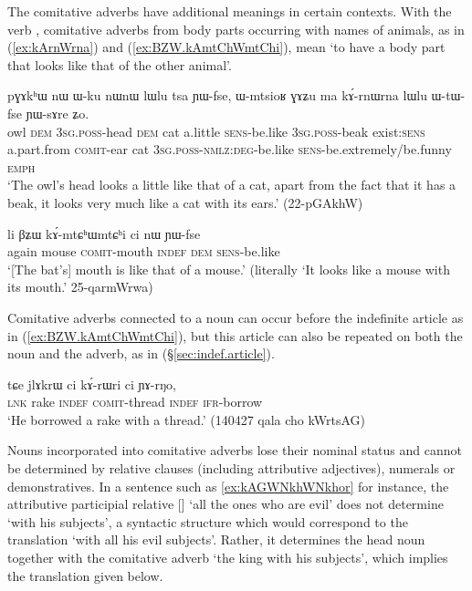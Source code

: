 The comitative adverbs have additional meanings in certain contexts. With the verb , comitative adverbs from body parts occurring with names of animals, as in (\ref{ex:kArnWrna}) and (\ref{ex:BZW.kAmtChWmtChi}), mean `to have a body part that looks like that of the other animal'.
\largerpage
\begin{exe}
	\ex \label{ex:kArnWrna}
	\gll pɣɤkʰɯ nɯ ɯ-ku nɯnɯ lɯlu tsa ɲɯ-fse, ɯ-mtsioʁ ɣɤʑu ma kɤ́-rnɯ\redp{}rna lɯlu ɯ-tɯ-fse ɲɯ-sɤre ʑo. \\
	owl \textsc{dem} \textsc{3sg}.\textsc{poss}-head \textsc{dem} cat a.little \textsc{sens}-be.like \textsc{3sg}.\textsc{poss}-beak exist:\textsc{sens} a.part.from \textsc{comit}-ear cat \textsc{3sg}.\textsc{poss}-\textsc{nmlz}:\textsc{deg}-be.like \textsc{sens}-be.extremely/be.funny \textsc{emph} \\
	\glt `The owl's head looks a little like that of a cat, apart from the fact that it has a beak, it looks very much like a cat with its ears.' (22-pGAkhW)
\end{exe}

\begin{exe}
\ex \label{ex:BZW.kAmtChWmtChi}
\gll li βʑɯ kɤ́-mtɕʰɯ\redp{}mtɕʰi ci nɯ ɲɯ-fse \\
again mouse \textsc{comit}-mouth \textsc{indef} \textsc{dem} \textsc{sens}-be.like \\
\glt `[The bat's] mouth is like that of a mouse.' (literally `It looks like a mouse with its mouth.' 25-qarmWrwa) 
\end{exe}

Comitative adverbs connected to a noun can occur before the indefinite article  as in (\ref{ex:BZW.kAmtChWmtChi}), but this article can also be repeated on both the noun and the adverb, as in (§\ref{sec:indef.article}).

\begin{exe}
\ex \label{ex:BZW.kArWri}
\gll tɕe jlɤkrɯ ci kɤ́-rɯ\redp{}ri ci ɲɤ-rŋo, \\
\textsc{lnk} rake \textsc{indef} \textsc{comit}-thread \textsc{indef} \textsc{ifr}-borrow \\
\glt `He borrowed a rake with a thread.' (140427 qala cho kWrtsAG) 
\end{exe}

Nouns incorporated into comitative adverbs lose their nominal status and cannot be determined by relative clauses (including attributive adjectives), numerals or demonstratives. In a sentence such as \ref{ex:kAGWNkhWNkhor} for instance, the attributive participial relative [] `all the ones who are evil' does not determine  `with his subjects', a syntactic structure which would correspond to the translation `with all his evil subjects'. Rather, it determines the head noun together with the comitative adverb   `the king with his subjects', which implies the translation given below.

